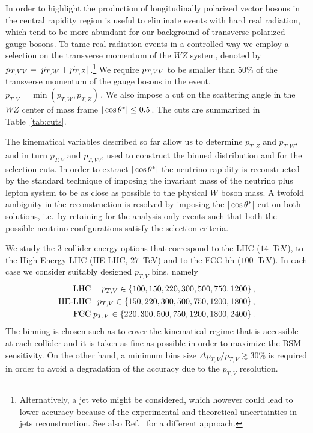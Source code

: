 \documentclass[../report.tex]{subfiles}
\begin{document}
In order to highlight the production of longitudinally polarized vector bosons in the central rapidity region is useful to eliminate events with hard real radiation, which tend to be more abundant for our background of transverse polarized gauge bosons. To tame real radiation events in a controlled way we employ a selection on the transverse momentum of the $WZ$ system, denoted by $p_{T,VV}=|{\vec{p}}_{T,W}+{\vec{p}}_{T,Z}|\,$.\footnote{Alternatively, a jet veto might be considered, which however could lead to lower accuracy because of the experimental and theoretical uncertainties in jets reconstruction.
See also Ref.~\cite{Campanario:2014lza} for a different approach.} We require $p_{T,VV}$ to be smaller than $50\%$ of the transverse momentum of the gauge bosons in the event, $p_{T,V} = \min(p_{T,W}, p_{T,Z})\,$. We also impose a cut on the scattering angle in the $WZ$ center of mass frame
$|\cos \theta^{*}| \leq  0.5\,$. The cuts are summarized in Table~\ref{tab:cuts}.



The kinematical variables described so far allow us to determine $p_{T,Z}$ and $p_{T,W}$, and in turn $p_{T,V}$ and $p_{T,VV}$, used to construct the binned distribution and for the selection cuts. In order to extract $|\cos \theta^{*}|$ the neutrino rapidity is reconstructed by the standard technique of imposing the invariant mass of the neutrino plus lepton system to be as close as possible to the physical $W$ boson mass.
A twofold ambiguity in the reconstruction is resolved by imposing the $|\cos \theta^{*}|$ cut on both solutions, i.e.~by retaining for the analysis only events such that both the possible neutrino configurations satisfy the selection criteria.

We study the $3$ collider energy options that correspond to the LHC ($14$~TeV), to the High-Energy LHC (HE-LHC, $27$~TeV) and to the FCC-hh ($100$~TeV). In each case we consider suitably designed $p_{T,V}$ bins, namely 
\begin{eqnarray}\label{finalbins}
{\textrm{LHC\hspace{-10pt}}}&{\textrm{:}}& p_{T,V}\in\{100,150,220,300,500,750,1200 \}\,,\\
{\textrm{HE-LHC\hspace{-10pt}}}&{\textrm{:}}& p_{T,V}\in\{150,220,300,500,750,1200, 1800 \}\,,\nonumber\\
{\textrm{FCC\hspace{-10pt}}}&{\textrm{:}}& p_{T,V}\in\{220,300,500,750,1200, 1800, 2400 \}\,.\nonumber
\end{eqnarray}
The binning is chosen such as to cover the kinematical regime that is accessible at each collider and it is taken as fine as possible in order to maximize the BSM sensitivity. On the other hand, a minimum bins size $\Delta p_{T,V}/ p_{T,V}\gtrsim30\%$ is required in order to avoid a degradation of the accuracy due to the $p_{T,V}$ resolution.
\end{document}
